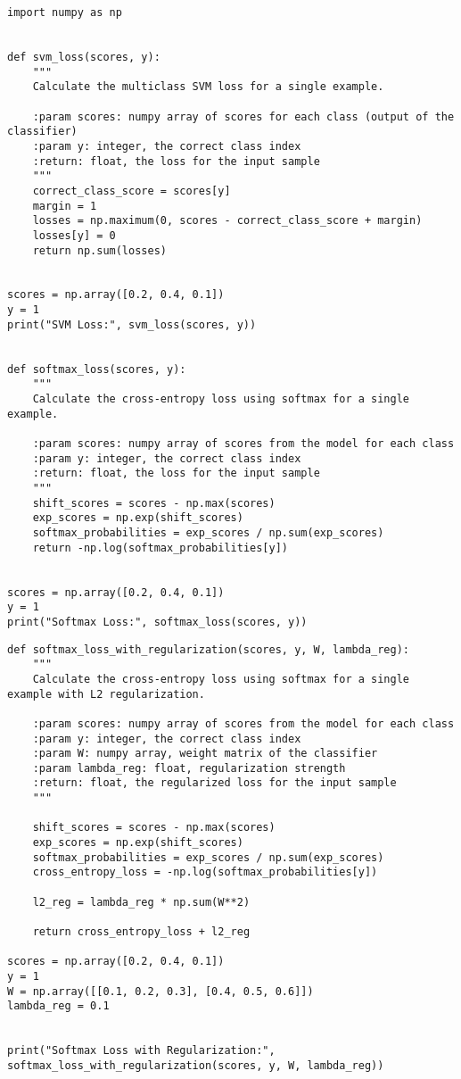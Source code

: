 \documentclass{article}
\begin{document}
\begin{lstlisting}
import numpy as np


def svm_loss(scores, y):
    """
    Calculate the multiclass SVM loss for a single example.
    
    :param scores: numpy array of scores for each class (output of the classifier)
    :param y: integer, the correct class index
    :return: float, the loss for the input sample
    """
    correct_class_score = scores[y]
    margin = 1  
    losses = np.maximum(0, scores - correct_class_score + margin)
    losses[y] = 0  
    return np.sum(losses)


scores = np.array([0.2, 0.4, 0.1])
y = 1  
print("SVM Loss:", svm_loss(scores, y))


def softmax_loss(scores, y):
    """
    Calculate the cross-entropy loss using softmax for a single example.
    
    :param scores: numpy array of scores from the model for each class
    :param y: integer, the correct class index
    :return: float, the loss for the input sample
    """
    shift_scores = scores - np.max(scores)
    exp_scores = np.exp(shift_scores)
    softmax_probabilities = exp_scores / np.sum(exp_scores)
    return -np.log(softmax_probabilities[y])


scores = np.array([0.2, 0.4, 0.1])
y = 1  
print("Softmax Loss:", softmax_loss(scores, y))
\end{lstlisting}

\begin{lstlisting}
def softmax_loss_with_regularization(scores, y, W, lambda_reg):
    """
    Calculate the cross-entropy loss using softmax for a single example with L2 regularization.
    
    :param scores: numpy array of scores from the model for each class
    :param y: integer, the correct class index
    :param W: numpy array, weight matrix of the classifier
    :param lambda_reg: float, regularization strength
    :return: float, the regularized loss for the input sample
    """

    shift_scores = scores - np.max(scores)
    exp_scores = np.exp(shift_scores)
    softmax_probabilities = exp_scores / np.sum(exp_scores)
    cross_entropy_loss = -np.log(softmax_probabilities[y])
    
    l2_reg = lambda_reg * np.sum(W**2)
    
    return cross_entropy_loss + l2_reg

scores = np.array([0.2, 0.4, 0.1])
y = 1
W = np.array([[0.1, 0.2, 0.3], [0.4, 0.5, 0.6]]) 
lambda_reg = 0.1  


print("Softmax Loss with Regularization:", softmax_loss_with_regularization(scores, y, W, lambda_reg))
\end{lstlisting}
\end{document}
